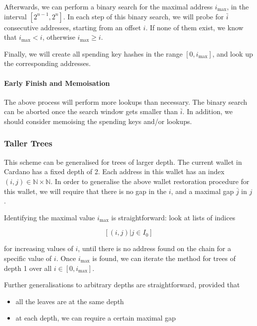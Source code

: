 \documentclass[11pt,a4paper]{article}
\begin{document}
Afterwards, we can perform a binary search for the maximal address
\(i_\text{max}\), in the interval \([2^{n-1}, 2^n]\). In each step of
this binary search, we will probe for \(\bar{i}\) consecutive addresses,
starting from an offset \(i\). If none of them exist, we know that
\(i_\text{max} < i\), otherwise \(i_\text{max} \geq i\).

Finally, we will create all spending key hashes in the range
\([0, i_\text{max}]\), and look up the corresponding addresses.

\paragraph{Early Finish and Memoisation}

The above process will perform more lookups than necessary. The binary
search can be aborted once the search window gets smaller than
\(\bar{i}\). In addition, we should consider memoising the spending keys
and/or lookups.

\subsubsection{Taller Trees}
\label{taller-trees}

This scheme can be generalised for trees of larger depth. The current
wallet in Cardano has a fixed depth of 2. Each address in this wallet
has an index \((i, j) \in \mathbb{N} \times \mathbb{N}\). In order to
generalise the above wallet restoration procedure for this wallet, we
will require that there is no gap in the \(i\), and a maximal gap
\(\bar{j}\) in \(j\).

Identifying the maximal value \(i_\text{max}\) is straightforward: look
at lists of indices

\[
[(i, j) | j \in I_0]
\]

for increasing values of \(i\), until there is no address found on the
chain for a specific value of \(i\). Once \(i_\text{max}\) is found, we
can iterate the method for trees of depth 1 over all
\(i \in [0, i_\text{max}]\).

Further generalisations to arbitrary depths are straightforward,
provided that

\begin{itemize}
\item
  all the leaves are at the same depth
\item
  at each depth, we can require a certain maximal gap
\end{itemize}
\end{document}
